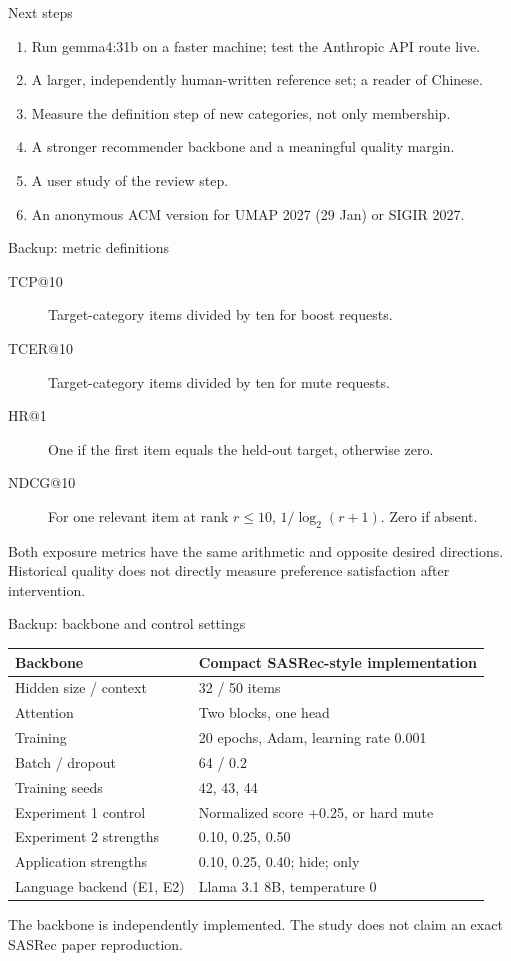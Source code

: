 \documentclass[10pt]{beamer}
\newcommand{\toprule}{\hline}
\newcommand{\midrule}{\hline}
\newcommand{\bottomrule}{\hline}
\newcommand{\src}[1]{\vfill{\tiny\color{bcitgray}#1}}
\begin{document}
\begin{frame}{Next steps}
\small
\begin{enumerate}
\item Run gemma4:31b on a faster machine; test the Anthropic API route live.
\item A larger, independently human-written reference set; a reader of Chinese.
\item Measure the definition step of new categories, not only membership.
\item A stronger recommender backbone and a meaningful quality margin.
\item A user study of the review step.
\item An anonymous ACM version for UMAP 2027 (29 Jan) or SIGIR 2027.
\end{enumerate}
\end{frame}

\appendix
\begin{frame}{Backup: metric definitions}
\begin{description}
\item[TCP@10] Target-category items divided by ten for boost requests.
\item[TCER@10] Target-category items divided by ten for mute requests.
\item[HR@1] One if the first item equals the held-out target, otherwise zero.
\item[NDCG@10] For one relevant item at rank $r\leq10$, $1/\log_2(r+1)$. Zero if absent.
\end{description}
\vspace{0.3cm}
Both exposure metrics have the same arithmetic and opposite desired directions. Historical quality does not directly measure preference satisfaction after intervention.
\end{frame}

\begin{frame}{Backup: backbone and control settings}
\begin{tabular}{@{}P{3.8cm}P{6.0cm}@{}}
\toprule
Backbone & Compact SASRec-style implementation\\\midrule
Hidden size / context & 32 / 50 items\\
Attention & Two blocks, one head\\
Training & 20 epochs, Adam, learning rate 0.001\\
Batch / dropout & 64 / 0.2\\
Training seeds & 42, 43, 44\\
Experiment 1 control & Normalized score +0.25, or hard mute\\
Experiment 2 strengths & 0.10, 0.25, 0.50\\
Application strengths & 0.10, 0.25, 0.40; hide; only\\
Language backend (E1, E2) & Llama 3.1 8B, temperature 0\\\bottomrule
\end{tabular}\par
\src{The backbone is independently implemented. The study does not claim an exact SASRec paper reproduction.}
\end{frame}
\end{document}
